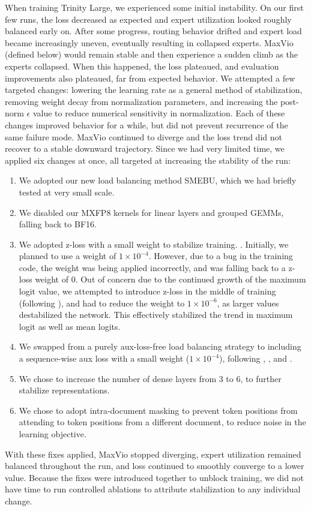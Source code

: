 \documentclass{article}
\begin{document}
When training Trinity Large, we experienced some initial instability. On our first few runs, the loss decreased as expected and expert utilization looked roughly balanced early on. After some progress, routing behavior drifted and expert load became increasingly uneven, eventually resulting in collapsed experts. MaxVio (defined below) \citep{wang2024auxiliarylossfreeloadbalancingstrategy} would remain stable and then experience a sudden climb as the experts collapsed. When this happened, the loss plateaued, and evaluation improvements also plateaued, far from expected behavior. We attempted a few targeted changes: lowering the learning rate as a general method of stabilization, removing weight decay from normalization parameters, and increasing the post-norm $\epsilon$ value to reduce numerical sensitivity in normalization. Each of these changes improved behavior for a while, but did not prevent recurrence of the same failure mode. MaxVio continued to diverge and the loss trend did not recover to a stable downward trajectory. Since we had very limited time, we applied six changes at once, all targeted at increasing the stability of the run:
\begin{enumerate}
    \item We adopted our new load balancing method SMEBU, which we had briefly tested at very small scale.
    \item We disabled our MXFP8 kernels for linear layers and grouped GEMMs, falling back to BF16.
    \item We adopted z-loss with a small weight to stabilize training. \citep{wortsman2023smallscaleproxieslargescaletransformer, olmo20252olmo2furious}. Initially, we planned to use a weight of $1\times 10^{-4}$. However, due to a bug in the training code, the weight was being applied incorrectly, and was falling back to a z-loss weight of $0$. Out of concern due to the continued growth of the maximum logit value, we attempted to introduce z-loss in the middle of training (following \cite{marin_8b_retro}), and had to reduce the weight to $1\times 10^{-6}$, as larger values destabilized the network. This effectively stabilized the trend in maximum logit as well as mean logits.
    \item We swapped from a purely aux-loss-free load balancing strategy to including a sequence-wise aux loss with a small weight ($1\times 10^{-4}$), following \cite{deepseekai2025deepseekv3technicalreport}, \cite{5team2025glm45agenticreasoningcoding}, and \cite{coreteam2026mimov2flashtechnicalreport}.
    \item We chose to increase the number of dense layers from 3 to 6, to further stabilize representations.
    \item We chose to adopt intra-document masking to prevent token positions from attending to token positions from a different document, to reduce noise in the learning objective.
\end{enumerate}
With these fixes applied, MaxVio stopped diverging, expert utilization remained balanced throughout the run, and loss continued to smoothly converge to a lower value. Because the fixes were introduced together to unblock training, we did not have time to run controlled ablations to attribute stabilization to any individual change.
\end{document}
